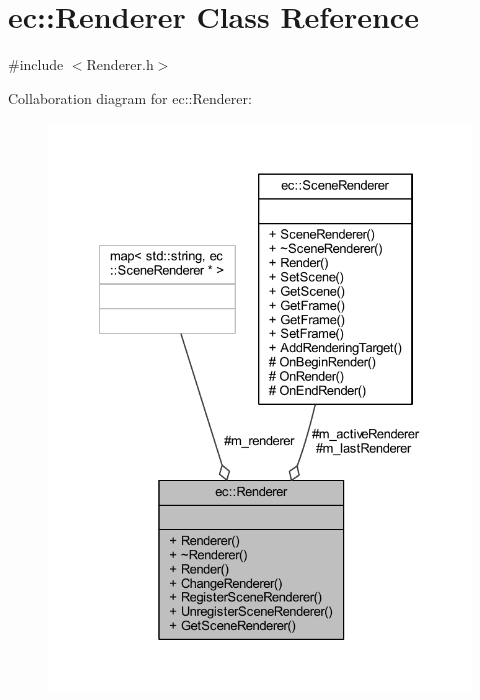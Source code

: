 \hypertarget{classec_1_1_renderer}{}\section{ec\+:\+:Renderer Class Reference}
\label{classec_1_1_renderer}


{\ttfamily \#include $<$Renderer.\+h$>$}



Collaboration diagram for ec\+:\+:Renderer\+:
\nopagebreak
\begin{figure}[H]
\begin{center}
\leavevmode
\includegraphics[width=328pt]{classec_1_1_renderer__coll__graph}
\end{center}
\end{figure}
